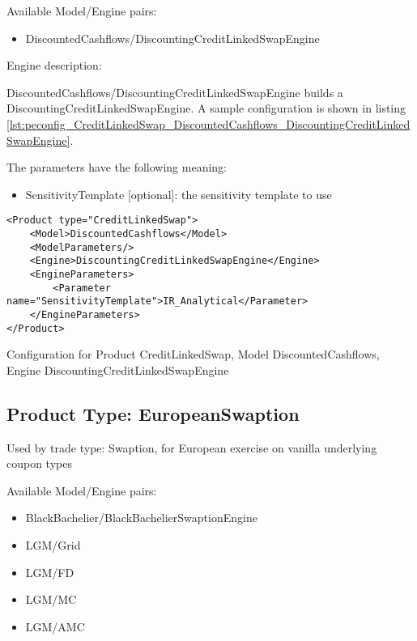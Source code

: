 Available Model/Engine pairs:

\begin{itemize}
\item DiscountedCashflows/DiscountingCreditLinkedSwapEngine
\end{itemize}

Engine description:

DiscountedCashflows/DiscountingCreditLinkedSwapEngine builds a DiscountingCreditLinkedSwapEngine. A sample configuration is shown
in listing \ref{lst:peconfig_CreditLinkedSwap_DiscountedCashflows_DiscountingCreditLinkedSwapEngine}.

The parameters have the following meaning:

\begin{itemize}
\item SensitivityTemplate [optional]: the sensitivity template to use 
\end{itemize}

\begin{longlisting}
\begin{verbatim}
<Product type="CreditLinkedSwap">
    <Model>DiscountedCashflows</Model>
    <ModelParameters/>
    <Engine>DiscountingCreditLinkedSwapEngine</Engine>
    <EngineParameters>
        <Parameter name="SensitivityTemplate">IR_Analytical</Parameter>
    </EngineParameters>
</Product>
\end{verbatim}
\caption{Configuration for Product CreditLinkedSwap, Model DiscountedCashflows, Engine DiscountingCreditLinkedSwapEngine}
\label{lst:peconfig_CreditLinkedSwap_DiscountedCashflows_DiscountingCreditLinkedSwapEngine}
\end{longlisting}

\subsection{Product Type: EuropeanSwaption}
\label{sec:EuropeanSwaption_pt}
Used by trade type: Swaption, for European exercise on vanilla underlying coupon types

Available Model/Engine pairs:

\begin{itemize}
\item BlackBachelier/BlackBachelierSwaptionEngine
\item LGM/Grid
\item LGM/FD
\item LGM/MC
\item LGM/AMC
\end{itemize}

